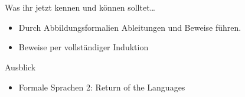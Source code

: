 





\section{}
	\begin{frame}{Was ihr jetzt kennen und können solltet\dots}
			\begin{itemize}
				\item Durch Abbildungsformalien Ableitungen und Beweise führen.
				\item Beweise per vollständiger Induktion
			\end{itemize}
	
	\end{frame}
\begin{frame}[fragile]{Ausblick}
 		\begin{itemize}
 			\item Formale Sprachen 2: Return of the Languages
 		\end{itemize}
\end{frame}
\section{}
\questionframe
\lastframe
{}
